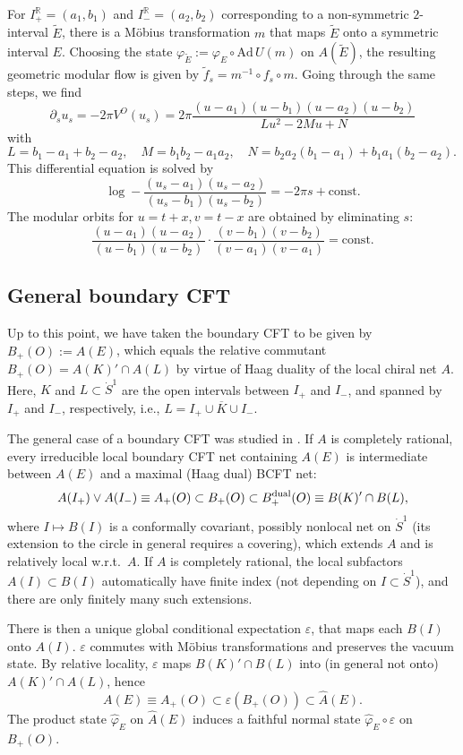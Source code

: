 \documentclass[12pt]{article}
\def\eps{\varepsilon}
\def \RR {{\mathbb R}}
\def \Sdot {\dot S^1}
\def\const{\mathrm{const.}}
\def\Ad{\mathrm{Ad}\,}
\def\inv{^{-1}}
\def\ovl{\overline}
\def\be{\begin{equation}} \def\bea{\begin{eqnarray}}
\def\ee{\end{equation}}\def\ea{\end{array}}
\begin{document}
For $I^\RR_+=(a_1,b_1)$ and $I^\RR_-=(a_2,b_2)$ corresponding to a
non-symmetric $2$-interval $\tilde E$, there is a Möbius
transformation $m$ that maps $\tilde E$ onto a symmetric interval
$E$. Choosing the state $\varphi_{\tilde E}:=\varphi_{E}\circ\Ad U(m)$
on $A(\tilde E)$, the resulting geometric modular flow is given by
$\tilde f_s = m\inv \circ f_s\circ m$. Going through the same steps,
we find  
\be 
\label{diff}
\partial_s u_s = -2\pi V^O(u_s) = 
2\pi \frac{(u-a_1)(u-b_1)(u-a_2)(u-b_2)}{Lu^2-2Mu+N}
\ee
with
\be
L=b_1-a_1+b_2-a_2,\quad M= b_1b_2-a_1a_2,\quad
N=b_2a_2(b_1-a_1)+b_1a_1(b_2-a_2). \quad
\ee
This differential equation is solved
by 
\be
\label{sol}
  \log-\frac{(u_s-a_1)(u_s-a_2)}{(u_s-b_1)(u_s-b_2)}= -2\pi s + \const
\ee
The modular orbits for $u=t+x,v=t-x$ are obtained by eliminating $s$:
\be
\label{orb}
  \frac{(u-a_1)(u-a_2)}{(u-b_1)(u-b_2)}\cdot
  \frac{(v-b_1)(v-b_2)}{(v-a_1)(v-a_1)}=\const
\ee

\subsection{General boundary CFT}

Up to this point, we have taken the boundary CFT to be given by 
$B_+(O):=\widehat A(E)$, which equals the relative commutant
$B_+(O)= A(K)'\cap A(L)$ by virtue of Haag duality of the local chiral
net $A$. Here, $K$ and $L\subset\Sdot$ are the open
intervals between $I_+$ and $I_-$, and spanned by $I_+$
and $I_-$, respectively, i.e., $L=I_+\cup \ovl K\cup I_-$. 

The general case of a boundary CFT was studied in \cite{LR04}. If $A$
is completely rational, every irreducible local boundary CFT net
containing $A(E)$ is intermediate between $A(E)$ and a maximal (Haag
dual) BCFT net: 
\be
  A(I_+)\vee A(I_-) \equiv A_+(O) \subset B_+(O)\subset B_+^{\rm dual}
  (O)\equiv B(K)'\cap B(L),
\ee
where $I\mapsto B(I)$ is a conformally covariant, possibly nonlocal
net on $\Sdot$ (its extension to the circle in general requires a
covering), which extends $A$ and is relatively local w.r.t.\ $A$. If $A$
is completely rational, the local subfactors $A(I)\subset B(I)$
automatically have finite index (not depending on $I\subset\Sdot$), and
there are only finitely many such extensions.  

There is then a unique global conditional expectation $\eps$, that maps
each $B(I)$ onto $A(I)$. $\eps$ commutes with Möbius transformations
and preserves the vacuum state. By relative locality, $\eps$ maps  
$B(K)'\cap B(L)$ into (in general not onto) $A(K)'\cap A(L)$, hence  
\be
  A(E)\equiv  A_+(O)\subset \eps(B_+(O)) \subset \widehat A(E).
\ee
The product state $\widehat\varphi_E$ on $\widehat A(E)$ 
induces a faithful normal state $\widehat\varphi_E\circ\eps$ on 
$B_+(O)$. 
\end{document}
